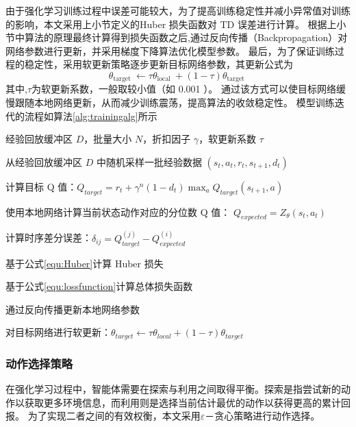 由于强化学习训练过程中误差可能较大，为了提高训练稳定性并减小异常值对训练的影响，本文采用上小节定义的Huber 损失函数对 TD 误差进行计算。
根据上小节中算法的原理最终计算得到损失函数之后,通过反向传播（Backpropagation）对网络参数进行更新，并采用梯度下降算法优化模型参数。
最后，为了保证训练过程的稳定性，采用软更新策略逐步更新目标网络参数，其更新公式为
\begin{equation}
\theta_{\text {target }} \leftarrow \tau \theta_{\text {local }}+(1-\tau) \theta_{\text {target }}
\end{equation}
其中,$\tau$为软更新系数，一般取较小值（如 0.001 ）。
通过该方式可以使目标网络缓慢跟随本地网络更新，从而减少训练震荡，提高算法的收敛稳定性。
模型训练迭代的流程如算法\ref{alg:trainingalg}所示
\begin{algorithm}[htbp]
  \caption{IQN网络模型训练流程}
  \label{alg:trainingalg}
  \begin{algorithmic}[1]
  
  \Require 经验回放缓冲区 $D$，批量大小 $N$，折扣因子 $\gamma$，软更新系数 $\tau$
  
  
  \State 从经验回放缓冲区 $D$ 中随机采样一批经验数据 $(s_t,a_t,r_t,s_{t+1},d_t)$
  
  \State 计算目标 Q 值：$Q_{target}=r_t+\gamma^n(1-d_t)\max_a Q_{target}(s_{t+1},a)$
  
  \State 使用本地网络计算当前状态动作对应的分位数 Q 值： $Q_{expected}=Z_{\theta}(s_t,a_t)$
  
  \State 计算时序差分误差：$\delta_{ij}=Q_{target}^{(j)}-Q_{expected}^{(i)}$
  
  \State 基于公式\ref{equ:Huber}计算 Huber 损失
  
  \State 基于公式\ref{equ:lossfunction}计算总体损失函数
  
  \State 通过反向传播更新本地网络参数
  
  \State 对目标网络进行软更新：$\theta_{target}\leftarrow\tau\theta_{local}+(1-\tau)\theta_{target}$

  
  \EndFor
  
  \end{algorithmic}
  \end{algorithm}

\subsubsection{动作选择策略}
在强化学习过程中，智能体需要在探索与利用之间取得平衡。探索是指尝试新的动作以获取更多环境信息，而利用则是选择当前估计最优的动作以获得更高的累计回报。
为了实现二者之间的有效权衡，本文采用$\varepsilon$－贪心策略进行动作选择。


